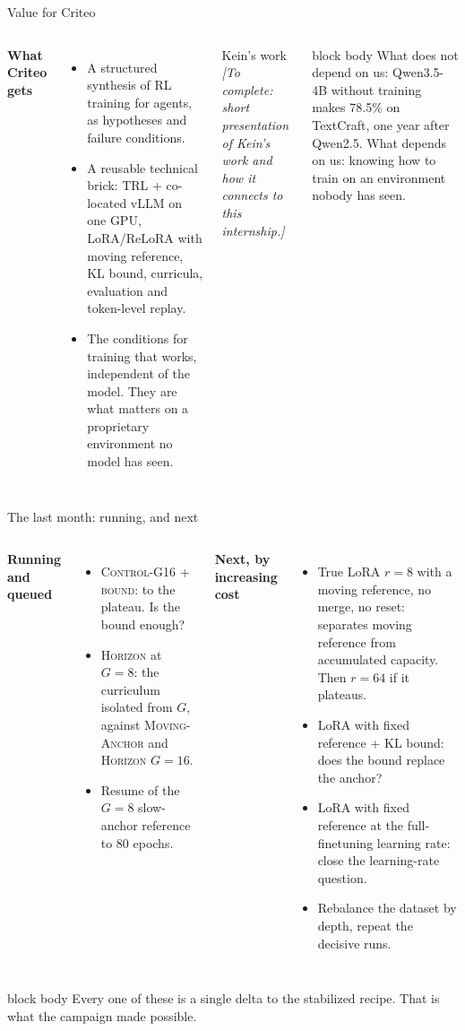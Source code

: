 \documentclass[aspectratio=169,10pt]{beamer}
\newenvironment{keymsg}{\begin{beamercolorbox}[sep=6pt,wd=\textwidth]{block body}\small}{\end{beamercolorbox}}
\begin{document}
\begin{frame}{Value for Criteo}
\begin{columns}[T]
\textbf{What Criteo gets}
\begin{itemize}
  \item A structured synthesis of RL training for agents, as hypotheses and failure conditions.
  \item A reusable technical brick: TRL + co-located vLLM on one GPU, LoRA/ReLoRA with moving reference, KL bound, curricula, evaluation and token-level replay.
  \item The conditions for training that works, independent of the model. They are what matters on a proprietary environment no model has seen.
\end{itemize}
\begin{block}{Kein's work}
\small \textit{[To complete: short presentation of Kein's work and how it connects to this internship.]}
\end{block}
\vspace{0.2cm}
\begin{keymsg}
What does not depend on us: Qwen3.5-4B without training makes 78.5\% on TextCraft, one year after Qwen2.5. What depends on us: knowing how to train on an environment nobody has seen.
\end{keymsg}
\end{columns}
\end{frame}

\begin{frame}{The last month: running, and next}
\small
\begin{columns}[T]
\textbf{Running and queued}
\begin{itemize}
  \item \textsc{Control-G16 + bound}: to the plateau. Is the bound enough?
  \item \textsc{Horizon} at $G=8$: the curriculum isolated from $G$, against \textsc{Moving-Anchor} and \textsc{Horizon} $G=16$.
  \item Resume of the $G=8$ slow-anchor reference to 80 epochs.
\end{itemize}
\textbf{Next, by increasing cost}
\begin{itemize}
  \item True LoRA $r=8$ with a moving reference, no merge, no reset: separates moving reference from accumulated capacity. Then $r=64$ if it plateaus.
  \item LoRA with fixed reference + KL bound: does the bound replace the anchor?
  \item LoRA with fixed reference at the full-finetuning learning rate: close the learning-rate question.
  \item Rebalance the dataset by depth, repeat the decisive runs.
\end{itemize}
\end{columns}
\vspace{0.2cm}
\begin{keymsg}
Every one of these is a single delta to the stabilized recipe. That is what the campaign made possible.
\end{keymsg}
\end{frame}
\end{document}
